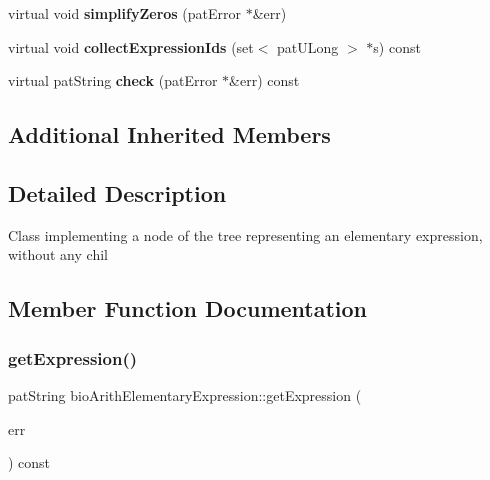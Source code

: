 \begin{DoxyCompactItemize}
\item 
\mbox{\label{classbio_arith_elementary_expression_a8f87ed84536747d5f8fe3e69773f621f}} 
virtual void {\bfseries simplify\+Zeros} (pat\+Error $\ast$\&err)
\item 
\mbox{\label{classbio_arith_elementary_expression_ae9d4c3a08a93fce0c901edf19638eedd}} 
virtual void {\bfseries collect\+Expression\+Ids} (set$<$ pat\+U\+Long $>$ $\ast$s) const
\item 
\mbox{\label{classbio_arith_elementary_expression_acfb07ccdaf1d39f91e3cdeda4c9c076a}} 
virtual pat\+String {\bfseries check} (pat\+Error $\ast$\&err) const
\end{DoxyCompactItemize}
\subsection*{Additional Inherited Members}


\subsection{Detailed Description}
Class implementing a node of the tree representing an elementary expression, without any chil 

\subsection{Member Function Documentation}
\mbox{\label{classbio_arith_elementary_expression_a9293635c83789f547b5642855f8c8f16}} 
\subsubsection{\texorpdfstring{get\+Expression()}{getExpression()}}
{\footnotesize\ttfamily pat\+String bio\+Arith\+Elementary\+Expression\+::get\+Expression (\begin{DoxyParamCaption}\item[{pat\+Error $\ast$\&}]{err }\end{DoxyParamCaption}) const\hspace{0.3cm}{\ttfamily [virtual]}}

